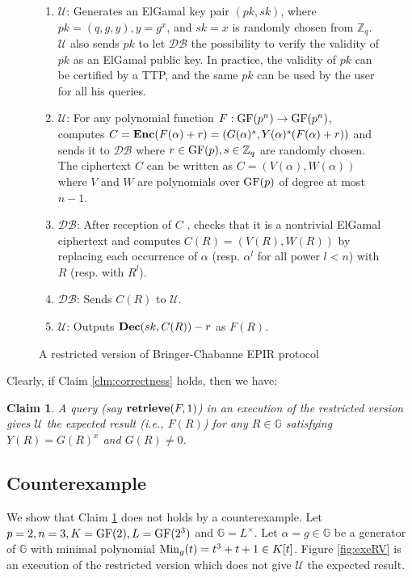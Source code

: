 \documentclass[JMC]{degruyter-journal}
\newtheorem{claim}{Claim}[section]
\begin{document}
\begin{figure}[ghp]
\begin{center}
\begin{boxedminipage}{12cm}
\begin{enumerate}
\itemsep=-0.1cm
\item $\mathcal{U}$:
Generates an ElGamal key pair $(pk, sk)$, where $pk = (q, g, y), y =
g^x$, and $sk = x$ is randomly chosen from $\mathbb{Z}_q$.
$\mathcal{U}$ also sends $pk$ to let $\mathcal{DB}$ the possibility
to verify the validity of $pk$ as an ElGamal public key. In
practice, the validity of $pk$ can be certified by a TTP, and the
same $pk$ can be used by the user for all his queries.
\item $\mathcal{U}$: For any polynomial function $F: {\rm GF}(p^n) \rightarrow {\rm GF}(p^n)$,
computes $C = {\bf Enc} (F (\alpha) + r) = (G(\alpha)^{s} , Y
(\alpha)^{s} (F (\alpha) + r))$ and sends it to $\mathcal{DB}$ where
 $r\in {\rm GF}(p), s \in \mathbb{Z}_q$ are randomly chosen. The ciphertext $C$ can
be written as $C = (V(\alpha),W(\alpha))$ where $V$ and $W$ are
polynomials over ${\rm GF}(p)$ of degree at most $n-1$.
\item$\mathcal{DB}$: After reception of $C$ , checks that it is a  nontrivial
ElGamal ciphertext and computes $C(R) = (V(R),W(R))$ by replacing
each occurrence of $\alpha$ (resp. $\alpha^{l}$ for all power
$l< n$) with $R$ (resp. with $R^{l}$).
\item $\mathcal{DB}$: Sends $C(R)$ to $\mathcal{U}$.
\item $\mathcal{U}$:  Outputs  ${\bf Dec}(sk, C(R))-r$ as $F(R)$.
\end{enumerate}
\end{boxedminipage}
\end{center}
\caption{A restricted version of Bringer-Chabanne EPIR protocol}
\label{fig:RV}
\end{figure}



Clearly, if Claim \ref{clm:correctness} holds, then we have:
\begin{claim}\label{clm:correctness_restricted}
A query {\em (say ${\bf retrieve}(F,1)$)} in an execution of
the restricted version  gives
 $\mathcal{U}$ the expected result {\em (i.e., $F(R)$)} for any  $R\in \mathbb{G}$
 satisfying $Y(R)=G(R)^x$ and $G(R)\neq 0$.
\end{claim}

\subsection{Counterexample}\label{sec:counterexample}
We show that Claim \ref{clm:correctness_restricted} does not holds
by a counterexample. Let $p=2, n=3, K={\rm GF}(2), L={\rm GF}(2^3)$
and $\mathbb{G}=L^{\times}$. Let $\alpha=g\in \mathbb{G}$ be a
generator of $\mathbb{G}$ with minimal polynomial ${\rm
Min}_{g}(t)=t^3+t+1\in K[t]$. Figure \ref{fig:exeRV} is an  execution of
the restricted version  which does not give $\mathcal{U}$ the expected result.
\end{document}
